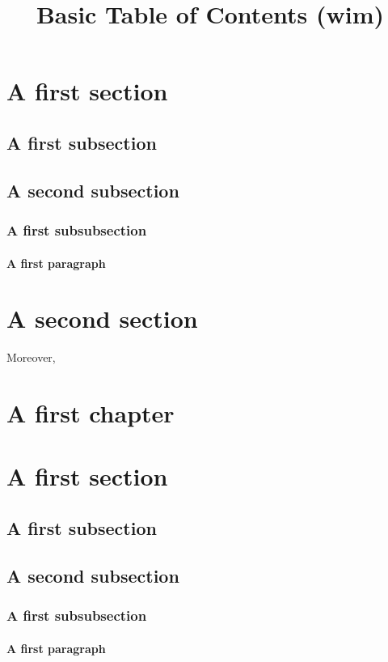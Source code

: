 \documentclass{article}
\title{Basic Table of Contents (wim)}
\newcounter{chapter}
\let\origsection\section
\newcommand{\chapter}[1]{\origsection{#1}}
\begin{document}
\maketitle

\tableofcontents
\clearpage

\section{A first section}
\lipsum[1][1]
\subsection{A first subsection}
\lipsum[2][1]
\subsection{A second subsection}
\lipsum[3][1]
\subsubsection{A first subsubsection}
\lipsum[4][1]
\paragraph{A first paragraph}
\lipsum[5][1]
\section{A second section}
Moreover, \lipsum[1][1]

\chapter{A first chapter}
\section{A first section}
\lipsum[1][1]
\subsection{A first subsection}
\lipsum[2][1]
\subsection{A second subsection}
\lipsum[3][1]
\subsubsection{A first subsubsection}
\lipsum[4][1]
\paragraph{A first paragraph}
\lipsum[5][1]
\end{document}
